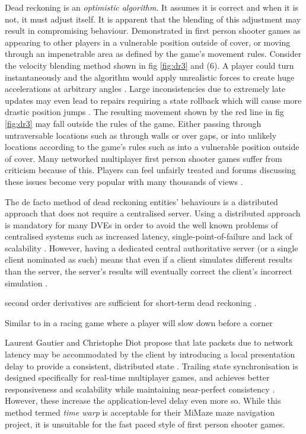 \documentclass[journal]{IEEEtran}
\begin{document}
Dead reckoning is an \textit{optimistic algorithm}. It assumes it is correct  and when it is not, it must adjust itself. It is apparent that the blending of this adjustment may result in compromising behaviour. Demonstrated in first person shooter games as appearing to other players in a vulnerable position outside of cover, or moving through an impenetrable area as defined by the game's movement rules. Consider the velocity blending method shown in fig \ref{fig:dr3} and (6). A player could turn instantaneously and the algorithm would apply unrealistic forces to create huge accelerations at arbitrary angles \cite{bernier2001latency}. Large inconsistencies due to extremely late updates may even lead to repairs requiring a state rollback which will cause more drastic position jumps \cite{cronin2002efficient}. The resulting movement shown by the red line in fig \ref{fig:dr3} may fall outside the rules of the game. Either passing through untraversable locations such as through walls or over gaps, or into unlikely locations according to the game's rules such as into a vulnerable position outside of cover. Many networked multiplayer first person shooter games suffer from criticism because of this. Players can feel unfairly treated and forums discussing these issues become very popular with many thousands of views \cite{rout2013youtube} \cite{gkac2014gamefaqs} \cite{drift0r2013youtube} \cite{solaire2016reddit} \cite{ss2018reddit} \cite{hp2015bungie}.

The de facto method of dead reckoning entities' behaviours is a distributed approach that does not require a centralised server. Using a distributed approach is mandatory for many DVEs in order to avoid the well known problems of centralised systems such as increased latency, single-point-of-failure and lack of scalability \cite{mauve2000keep}. However, having a dedicated central authoritative server (or a single client nominated as such) means that even if a client simulates different results than the server, the server’s results will eventually correct the client’s incorrect simulation \cite{bernier2001latency}.

second order derivatives are sufficient for short-term dead reckoning \cite{yahyavi2011antreckoning}.


Similar to in a racing game where a player will slow down before a corner \cite{larsson2016movement}


Laurent Gautier and Christophe Diot propose that late packets due to network latency may be accommodated by the client by introducing a local presentation delay to provide a consistent, distributed state \cite{gautier1998design}. Trailing state synchronisation is designed specifically for real-time multiplayer games, and achieves better responsiveness and scalability while maintaining near-perfect consistency \cite{cronin2001distributed}. However, these increase the application-level delay even more so. While this method termed \textit{time warp} is acceptable for their MiMaze maze navigation project, it is unsuitable for the fast paced style of first person shooter games.
\end{document}

